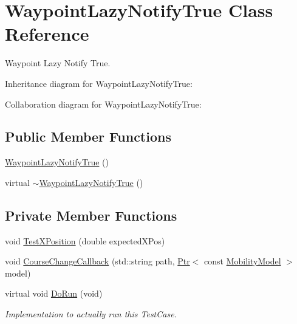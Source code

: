 \hypertarget{classWaypointLazyNotifyTrue}{}\section{Waypoint\+Lazy\+Notify\+True Class Reference}
\label{classWaypointLazyNotifyTrue}


Waypoint Lazy Notify True.  




Inheritance diagram for Waypoint\+Lazy\+Notify\+True\+:


Collaboration diagram for Waypoint\+Lazy\+Notify\+True\+:
\subsection*{Public Member Functions}
\begin{DoxyCompactItemize}
\item 
\hyperlink{classWaypointLazyNotifyTrue_a8899fc2605e3ed1f96e85d8175be1a06}{Waypoint\+Lazy\+Notify\+True} ()
\item 
virtual \hyperlink{classWaypointLazyNotifyTrue_a0d6c446f2097b386c7703b38f44326ec}{$\sim$\+Waypoint\+Lazy\+Notify\+True} ()
\end{DoxyCompactItemize}
\subsection*{Private Member Functions}
\begin{DoxyCompactItemize}
\item 
void \hyperlink{classWaypointLazyNotifyTrue_a02eac4fbc772cd0a5be43ef31f8000f3}{Test\+X\+Position} (double expected\+X\+Pos)
\item 
void \hyperlink{classWaypointLazyNotifyTrue_afb7087c4ae4146cc0878f2752f681293}{Course\+Change\+Callback} (std\+::string path, \hyperlink{classns3_1_1Ptr}{Ptr}$<$ const \hyperlink{classns3_1_1MobilityModel}{Mobility\+Model} $>$ model)
\item 
virtual void \hyperlink{classWaypointLazyNotifyTrue_a196fb0fa4ee5bfae48e7edb38c5d107e}{Do\+Run} (void)
\begin{DoxyCompactList}\small\item\em Implementation to actually run this Test\+Case. \end{DoxyCompactList}\end{DoxyCompactItemize}
